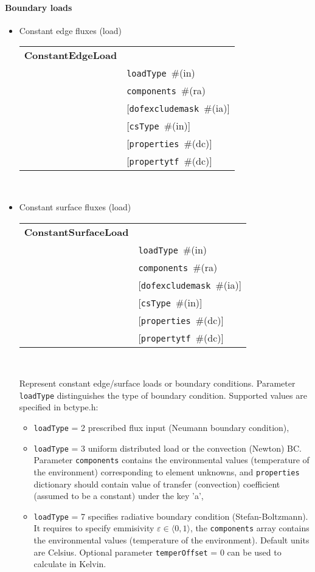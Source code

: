 \documentclass[a4paper]{article}
\newcommand{\param}[1]{\texttt{#1}} %
\newcommand{\optional}[1]{[#1]} %
\newcommand{\field}[2]{\param{#1}~\#{\tiny(#2)}} %
\newcommand{\optField}[2]{\optional{\field{#1}{#2}}}
\newcommand{\entKeywordInst}[1]{\textbf{#1}} %
\newenvironment{record}[1][]{\begin{tabular}{|ll}}{\end{tabular}\\}
\newcommand{\recentry}[2]{{#1}&{#2}\\}
\newcounter{rcc}
\newenvironment{record}[1][\textwidth]{\setcounter{rcc}{0}\rowcolors{1}{lightgray}{lightgray}\tabularx{#1}{llR} \hline}
               {\endtabularx}
\newcommand{\recentry}[2]{\ifthenelse{\value{rcc}>0}{$\backslash$ \\}{\setcounter{rcc}{1}}{#1}&{#2}&}
\begin{document}
\paragraph{Boundary loads}
\begin{itemize}
\item Constant edge fluxes (load)

\begin{record}[0.9\textwidth]
  \recentry{\entKeywordInst{ConstantEdgeLoad}}{}
  \recentry{}{\field{loadType}{in}}
  \recentry{}{\field{components}{ra}}
  \recentry{}{\optField{dofexcludemask}{ia}}
  \recentry{}{\optField{csType}{in}}
  \recentry{}{\optField{properties}{dc}}
  \recentry{}{\optField{propertytf}{dc}}
\end{record}
\item Constant surface fluxes (load)

\begin{record}[0.9\textwidth]
  \recentry{\entKeywordInst{ConstantSurfaceLoad}}{}
  \recentry{}{\field{loadType}{in}}
  \recentry{}{\field{components}{ra}}
  \recentry{}{\optField{dofexcludemask}{ia}}
  \recentry{}{\optField{csType}{in}}
  \recentry{}{\optField{properties}{dc}}
  \recentry{}{\optField{propertytf}{dc}}
\end{record}

Represent constant edge/surface loads or boundary conditions.
Parameter \param{loadType} distinguishes the type of boundary condition. Supported values are specified in bctype.h:
\begin{itemize}
\item \param{loadType} = 2 prescribed flux input (Neumann boundary condition),
\item \param{loadType} = 3 uniform distributed load or the convection (Newton) BC. Parameter \param{components} contains the
environmental values (temperature of the environment) corresponding to
element unknowns, and \param{properties} dictionary should contain
value of transfer (convection) coefficient (assumed to be a constant) under the key 'a',
\item \param{loadType} = 7 specifies radiative boundary condition (Stefan-Boltzmann). It requires to specify emmisivity $\varepsilon\in\langle 0,1\rangle$, the \param{components} array contains the environmental values (temperature of the environment). Default units are Celsius. Optional parameter \param{temperOffset} = 0 can be used to calculate in Kelvin.
\end{itemize}


\end{itemize}
\end{document}
